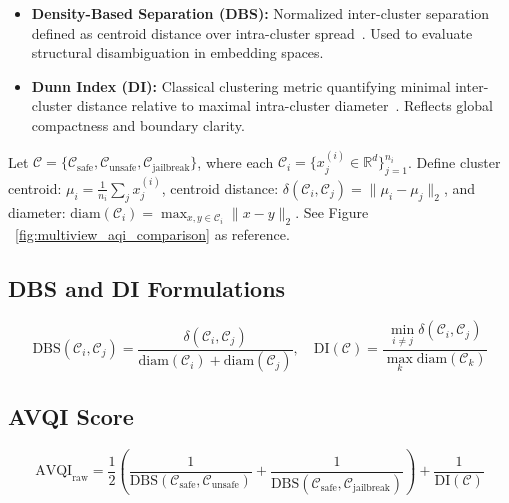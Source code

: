 \vspace{-3mm}
\begin{itemize}[leftmargin=1em,itemsep=0pt,parsep=1pt]
\item \textbf{Density-Based Separation (DBS):} Normalized inter-cluster separation defined as centroid distance over intra-cluster spread~\citep{zhang2009generalized}. Used to evaluate structural disambiguation in embedding spaces.
\item \textbf{Dunn Index (DI):} Classical clustering metric quantifying minimal inter-cluster distance relative to maximal intra-cluster diameter~\citep{dunn1973fuzzy}. Reflects global compactness and boundary clarity.
\end{itemize}
\vspace{-3mm}


Let \(\mathcal{C} = \{\mathcal{C}_{\text{safe}}, \mathcal{C}_{\text{unsafe}}, \mathcal{C}_{\text{jailbreak}}\}\), where each \(\mathcal{C}_i = \{x_j^{(i)} \in \mathbb{R}^d\}_{j=1}^{n_i}\). Define cluster centroid: \(\mu_i = \frac{1}{n_i} \sum_j x_j^{(i)}\), centroid distance: \(\delta(\mathcal{C}_i, \mathcal{C}_j) = \|\mu_i - \mu_j\|_2\), and diameter: \(\mathrm{diam}(\mathcal{C}_i) = \max_{x,y \in \mathcal{C}_i} \|x - y\|_2\). See Figure ~\ref{fig:multiview_aqi_comparison} as reference.







\subsection*{DBS and DI Formulations}
\vspace{-0.5em}
\[
\mathrm{DBS}(\mathcal{C}_i, \mathcal{C}_j) = \frac{\delta(\mathcal{C}_i, \mathcal{C}_j)}{\mathrm{diam}(\mathcal{C}_i) + \mathrm{diam}(\mathcal{C}_j)}, \quad
\mathrm{DI}(\mathcal{C}) = \frac{\min\limits_{i \ne j} \delta(\mathcal{C}_i, \mathcal{C}_j)}{\max\limits_k \mathrm{diam}(\mathcal{C}_k)}
\]

\subsection*{AVQI Score}
\vspace{-0.5em}
\[
\mathrm{AVQI}_{\text{raw}} = \frac{1}{2} \left( 
\frac{1}{\mathrm{DBS}(\mathcal{C}_{\text{safe}}, \mathcal{C}_{\text{unsafe}})} +
\frac{1}{\mathrm{DBS}(\mathcal{C}_{\text{safe}}, \mathcal{C}_{\text{jailbreak}})}
\right)
+ \frac{1}{\mathrm{DI}(\mathcal{C})}
\]

